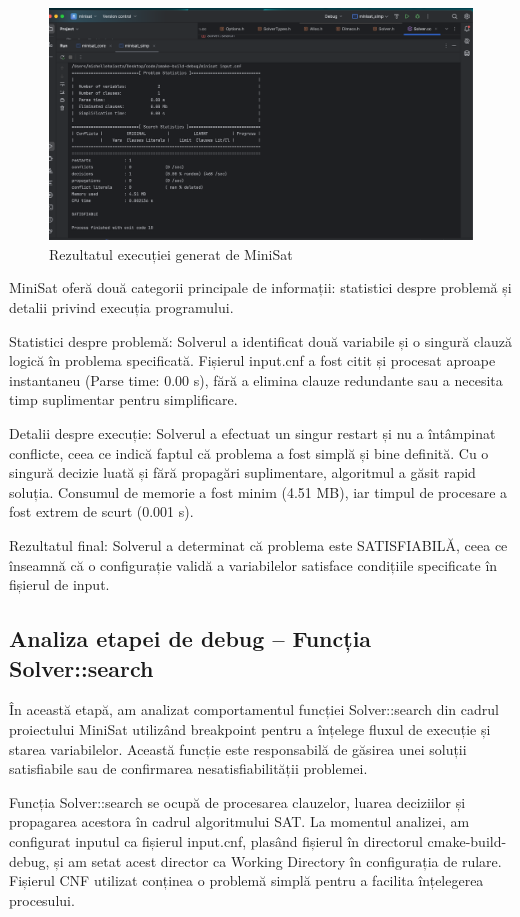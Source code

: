 \documentclass[runningheads]{llncs}
\begin{document}
\begin{figure}
    \centering
    \includegraphics[width=0.75\linewidth]{images/minista.png}
    \caption{Rezultatul execuției generat de MiniSat}
    \label{fig:2}
\end{figure}

MiniSat oferă două categorii principale de informații: statistici despre problemă și detalii privind execuția programului.

Statistici despre problemă: Solverul a identificat două variabile și o singură clauză logică în problema specificată. Fișierul input.cnf a fost citit și procesat aproape instantaneu (Parse time: 0.00 s), fără a elimina clauze redundante sau a necesita timp suplimentar pentru simplificare.

Detalii despre execuție: Solverul a efectuat un singur restart și nu a întâmpinat conflicte, ceea ce indică faptul că problema a fost simplă și bine definită. Cu o singură decizie luată și fără propagări suplimentare, algoritmul a găsit rapid soluția. Consumul de memorie a fost minim (4.51 MB), iar timpul de procesare a fost extrem de scurt (0.001 s).

Rezultatul final: Solverul a determinat că problema este SATISFIABILĂ, ceea ce înseamnă că o configurație validă a variabilelor satisface condițiile specificate în fișierul de input.
\subsection{Analiza etapei de debug – Funcția Solver::search}

În această etapă, am analizat comportamentul funcției Solver::search din cadrul proiectului MiniSat utilizând breakpoint pentru a înțelege fluxul de execuție și starea variabilelor. Această funcție este responsabilă de găsirea unei soluții satisfiabile sau de confirmarea nesatisfiabilității problemei.

Funcția Solver::search se ocupă de procesarea clauzelor, luarea deciziilor și propagarea acestora în cadrul algoritmului SAT. La momentul analizei, am configurat inputul ca fișierul input.cnf, plasând fișierul în directorul cmake-build-debug, și am setat acest director ca Working Directory în configurația de rulare. Fișierul CNF utilizat conținea o problemă simplă pentru a facilita înțelegerea procesului.
\end{document}
